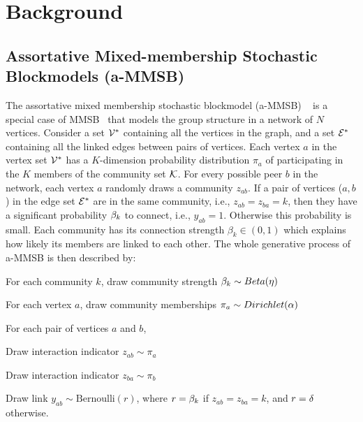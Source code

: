 \section{Background}

\subsection{Assortative Mixed-membership Stochastic Blockmodels (a-MMSB)}
The assortative mixed membership stochastic blockmodel (a-MMSB) ~\cite{gopalan2012scalable} is a special case of MMSB~\cite{airoldi2009mixed} that models the group structure in a network of $N$ vertices. Consider a set  $\cV^*$ containing all the vertices in the graph, and a set $\cE^*$ containing all the linked edges between pairs of vertices. Each vertex $a$ in the vertex set $\cV^*$ has a $K$-dimension probability distribution $\pi_a$ of participating in the $K$ members of the community set $\cK$.  For every possible peer $b$ in the network, each vertex $a$ randomly draws a community $z_{ab}$. If a pair of vertices ($a,b$) in the edge set $\cE^*$ are in the same community, i.e., $z_{ab}=z_{ba} = k$, then they have a significant probability $\beta_k$ to connect, i.e., $y_{ab}=1$. Otherwise this probability is small. Each community has its connection strength $\beta_{k} \in (0,1)$ which explains how likely its members are linked to each other. The whole generative process of a-MMSB is then described by:
\benum
\item For each community $k$, draw community strength $\beta_k \sim \relax{Beta}(\eta)$
\item For each vertex $a$, draw community memberships $\pi_a \sim \relax{Dirichlet}(\alpha)$
\item For each pair of vertices $a$ and $b$,
\benum
	\item Draw interaction indicator $z_{ab} \sim \pi_a$
    \item Draw interaction indicator $z_{ba} \sim \pi_b$
    \item Draw link $y_{ab} \sim \mbox{Bernoulli}(r)$, where $r = \beta_k$ if $z_{ab}=z_{ba}=k$, and $r=\delta$ otherwise.
\eenum
\eenum

